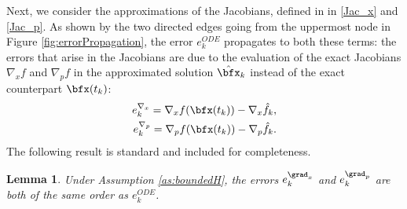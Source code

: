 \documentclass[DIV=12]{scrartcl} %
\newcommand{\err}{\ensuremath{e}}
\newtheorem{lemma}{Lemma}
\theoremstyle{definition}
\begin{document}
Next, we consider the approximations of the Jacobians, defined in in \eqref{Jac_x} and \eqref{Jac_p}. As shown by the two directed edges going from the uppermost node in Figure \ref{fig:errorPropagation}, the error $\err_k^{ODE}$ propagates to both these terms: the errors that arise in the Jacobians are due to the evaluation of the exact Jacobians $\nabla_x f$ and $\nabla_p f$ in the approximated solution $\hat{\bfx}_k$ instead of the exact counterpart $\bfx(t_k)$: 
\begin{align*}
    \err_k^{\nabla_x} = \nabla_xf(\bfx(t_k))-\nabla_x\hat{f}_k,\\
    \err_k^{\nabla_p} = \nabla_pf(\bfx(t_k))-\nabla_p\hat{f}_k.
\end{align*}
The following result is standard and included for completeness. 
\begin{lemma}
\label{lemma:Jacobians}
    Under Assumption \ref{as:boundedH}, the errors $\err_k ^{\grad _x}$ and $\err _k ^{\grad _p}$ are both of the same order as $\err _k ^{ODE}$.
\end{lemma}
\end{document}
